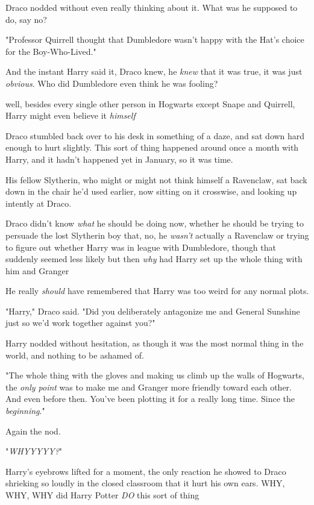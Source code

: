 Draco nodded without even really thinking about it. What was he supposed to do,
say no?

"Professor Quirrell thought that Dumbledore wasn't happy with the Hat's choice
for the Boy-Who-Lived."

And the instant Harry said it, Draco knew, he \emph{knew} that it was true, it
was just \emph{obvious}. Who did Dumbledore even think he was fooling?

{\el} well, besides every single other person in Hogwarts except Snape and
Quirrell, Harry might even believe it \emph{himself}{\el}

Draco stumbled back over to his desk in something of a daze, and sat down hard
enough to hurt slightly. This sort of thing happened around once a month with
Harry, and it hadn't happened yet in January, so it was time.

His fellow Slytherin, who might or might not think himself a Ravenclaw, sat
back down in the chair he'd used earlier, now sitting on it crosswise, and
looking up intently at Draco.

Draco didn't know \emph{what} he should be doing now, whether he should be
trying to persuade the lost Slytherin boy that, no, he \emph{wasn't} actually a
Ravenclaw{\el} or trying to figure out whether Harry was in league with
Dumbledore, though that suddenly seemed less likely{\el} but then \emph{why}
had Harry set up the whole thing with him and Granger{\el}

He really \emph{should} have remembered that Harry was too weird for any normal
plots.

"Harry," Draco said. "Did you deliberately antagonize me and General Sunshine
just so we'd work together against you?"

Harry nodded without hesitation, as though it was the most normal thing in the
world, and nothing to be ashamed of.

"The whole thing with the gloves and making us climb up the walls of Hogwarts,
the \emph{only point} was to make me and Granger more friendly toward each
other. And even before then. You've been plotting it for a really long time.
Since the \emph{beginning}."

Again the nod.

"\emph{WHYYYYY?}"

Harry's eyebrows lifted for a moment, the only reaction he showed to Draco
shrieking so loudly in the closed classroom that it hurt his own ears. WHY,
WHY, WHY did Harry Potter \emph{DO} this sort of thing{\el}

